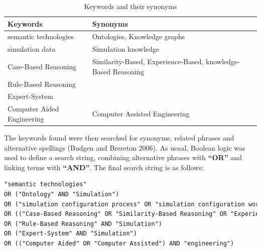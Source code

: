             \begin{table}[H]
                \centering
        	    {
        	    \begin{tabular}{ | m{5.5cm} | m{9cm} | }
                    \hline
                    \rowcolor{teal!30} Keywords & Synonyms \\
                    
                    \hline
                    semantic technologies  & Ontologies, Knowledge graphs\\
                    
                    \hline
                    simulation data & Simulation knowledge\\
                    
                    \hline
                    Case-Based Reasoning  & Similarity-Based, Experience-Based, knowledge-Based Reasoning\\
                    
                    \hline
                    Rule-Based Reasoning  & \\
                    
                    \hline
                    Expert-System  & \\
                    
                    \hline
                    Computer Aided Engineering  & Computer Assisted Engineering\\
                    
                    \hline
                \end{tabular}}
                \caption{\label{tab:keyw-syno} Keywords and their synonyms}
            \end{table}

            The keywords found were then searched for synonyms, related phrases and alternative spellings (Budgen and Brereton 2006). As usual, Boolean logic was used to define a search string, combining alternative phrases with \textbf{“OR”} and linking terms with \textbf{“AND”}. The final search string is as follows:

            \begin{lstlisting}[language=XML, caption=Generated Query, label={lst:gen-query}]
"semantic technologies" 
OR ("Ontology" AND "Simulation")
OR ("simulation configuration process" OR "simulation configuration workflow" OR "simulation configuration knowledge")
OR (("Case-Based Reasoning" OR "Similarity-Based Reasoning" OR "Experience-Based Reasoning" OR "knowledge-Based Reasoning") AND "Simulation")
OR ("Rule-Based Reasoning" AND "Simulation")
OR ("Expert-System" AND "Simulation")
OR (("Computer Aided" OR "Computer Assisted") AND "engineering")
            \end{lstlisting}

